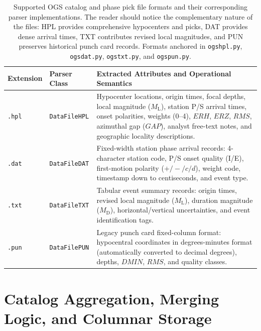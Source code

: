\begin{table}[htbp]
  \centering
  \small
  \caption{Supported \ac{OGS} catalog and phase pick file formats and
    their corresponding parser implementations. The reader should
    notice the complementary nature of the files: HPL provides
    comprehensive hypocenters and picks, DAT provides dense arrival
    times, TXT contributes revised local magnitudes, and PUN
    preserves historical punch card records. Formats anchored in
    \texttt{ogshpl.py}, \texttt{ogsdat.py}, \texttt{ogstxt.py}, and
  \texttt{ogspun.py}.}
  \label{tab:file_formats}
  \begin{threeparttable}
    \begin{tabularx}{\linewidth}{l l X}
      \toprule
      \textbf{Extension} & \textbf{Parser Class} &
      \textbf{Extracted Attributes and Operational Semantics} \\
      \midrule
      \texttt{.hpl} & \texttt{DataFileHPL} & Hypocenter locations, origin
      times, focal depths, local magnitude ($M_{\mathrm{L}}$), station P/S
      arrival times, onset polarities, weights (0--4), $ERH$, $ERZ$, $RMS$,
      azimuthal gap ($GAP$), analyst free-text notes, and geographic locality
      descriptions. \\
      \texttt{.dat} & \texttt{DataFileDAT} & Fixed-width station phase
      arrival records: 4-character station code, P/S onset quality (I/E),
      first-motion polarity ($+/-/c/d$), weight code, timestamp down to
      centiseconds, and event type. \\
      \texttt{.txt} & \texttt{DataFileTXT} & Tabular event summary records:
      origin times, revised local magnitude ($M_{\mathrm{L}}$), duration
      magnitude ($M_{\mathrm{D}}$), horizontal/vertical uncertainties, and
      event identification tags. \\
      \texttt{.pun} & \texttt{DataFilePUN} & Legacy punch card fixed-column
      format: hypocentral coordinates in degrees-minutes format
      (automatically converted to decimal degrees), depths, $DMIN$, $RMS$,
      and quality classes. \\
      \bottomrule
    \end{tabularx}
  \end{threeparttable}
\end{table}

\section{Catalog Aggregation, Merging Logic, and Columnar Storage}
\label{sec:catalog_aggregation}

